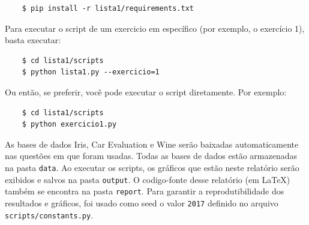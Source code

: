 \documentclass{article}
\begin{document}
\begin{verbatim}
	$ pip install -r lista1/requirements.txt
\end{verbatim}

Para executar o script de um exercicio em específico (por exemplo, o exercício 1), basta executar:

\begin{verbatim}
	$ cd lista1/scripts
	$ python lista1.py --exercicio=1
\end{verbatim}

Ou então, se preferir, você pode executar o script diretamente. Por exemplo:

\begin{verbatim}
	$ cd lista1/scripts
	$ python exercicio1.py
\end{verbatim}

As bases de dados Iris, Car Evaluation e Wine serão baixadas automaticamente nas questões em que foram usadas. Todas as bases de dados estão armazenadas na pasta \texttt{data}. Ao executar os scripts, os gráficos que estão neste relatório serão exibidos e salvos na pasta \texttt{output}. O codigo-fonte desse relatório (em \LaTeX) também se encontra na pasta \texttt{report}. Para garantir a reprodutibilidade dos resultados e gráficos, foi usado como seed o valor \texttt{2017} definido no arquivo \texttt{scripts/constants.py}.
\end{document}
